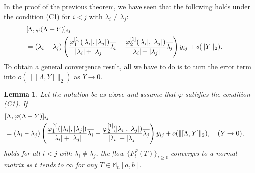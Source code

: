 \documentclass[12pt]{article}
\newtheorem{lemma}[theorem]{Lemma}
\theoremstyle{definition}
\numberwithin{equation}{section}
\newcommand{\M}{\mathbb{M}}
\begin{document}
In the proof of the previous theorem, we have seen that the following holds under the condition (C1) for 
$i<j$ with $\lambda_i\neq \lambda_j$:  
\begin{align}\label{derivative} 
\lefteqn{[\Lambda,\varphi(\Lambda+Y)]_{ij}} \\
	 &=(\lambda_i-\lambda_j)\left(  \frac{\varphi^{[1]}_1(|\lambda_i|,|\lambda_j|)}{|\lambda_i|+|\lambda_j|}\overline{\lambda_i}
	 -\frac{\varphi^{[1]}_2(|\lambda_i|,|\lambda_j|)}{|\lambda_i|+|\lambda_j|}\overline{\lambda_j} \right)y_{ij}+o(\|Y\|_2).\nonumber
\end{align}
To obtain a general convergence result, all we have to do is to turn the error term into $o(\|[\Lambda,Y]\|_2)$ 
as $Y\to 0$. 



\begin{lemma}\label{convergence}
Let the notation be as above and assume that $\varphi$ satisfies the condition (C1). 
If 
\begin{align}\label{criterion}
\lefteqn{[\Lambda,\varphi(\Lambda+Y)]_{ij}} \\
	 &=(\lambda_i-\lambda_j)\left(  \frac{\varphi^{[1]}_1(|\lambda_i|,|\lambda_j|)}{|\lambda_i|+|\lambda_j|}\overline{\lambda_i}
	 -\frac{\varphi^{[1]}_2(|\lambda_i|,|\lambda_j|)}{|\lambda_i|+|\lambda_j|}\overline{\lambda_j}\right)y_{ij}
	 +o(\|[\Lambda,Y]\|_2),\quad (Y\to 0),\nonumber
\end{align}
holds for all $i<j$ with $\lambda_i\neq \lambda_j$, the flow $\{F^\varphi_t(T)\}_{t\geq 0}$ converges to a normal matrix 
as $t$ tends to $\infty$ for any $T\in \M_n[a,b]$.  
\end{lemma}
\end{document}
